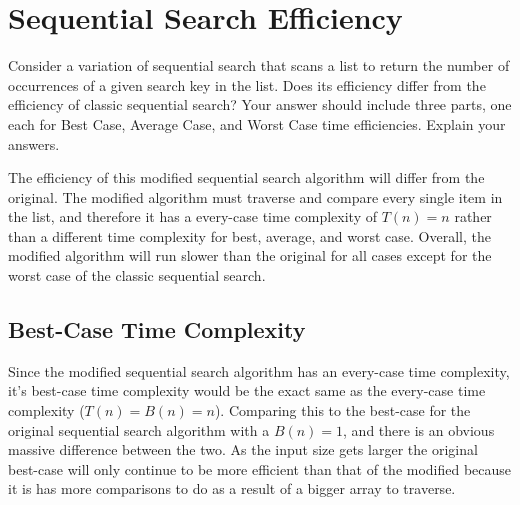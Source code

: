 \documentclass[11pt]{article}
\begin{document}
\begin{center}
\end{center}

\section{Sequential Search Efficiency}
Consider a variation of sequential search that scans a list to return the number of occurrences of a given search key in the list. Does its efficiency differ 
from the efficiency of classic sequential search? Your answer should include three parts, one each for Best Case, Average Case, and Worst Case time 
efficiencies. Explain your answers.

\bigskip 

\bigskip

The efficiency of this modified sequential search algorithm will differ from the original. The modified algorithm must traverse and compare every single item in the list, and therefore it has a every-case time complexity of $T(n)= n$ rather than a different time complexity for best, average, and worst case. Overall, the modified algorithm will run slower than the original for all cases except for the worst case of the classic sequential search.

\subsection*{Best-Case Time Complexity}
Since the modified sequential search algorithm has an every-case time complexity, it's best-case time complexity would be the exact same as the every-case time complexity ($T(n)=B(n)=n$). Comparing this to the best-case for the original sequential search algorithm with a $B(n)=1$, and there is an obvious massive difference between the two. As the input size gets larger the original best-case will only continue to be more efficient than that of the modified because it is has more comparisons to do as a result of a bigger array to traverse.
\end{document}
